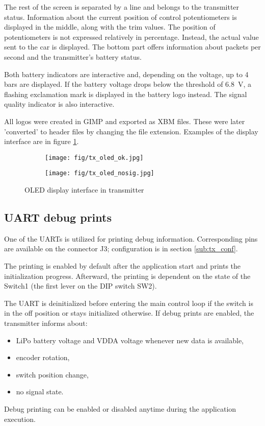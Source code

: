 The rest of the screen is separated by a line and belongs to the transmitter status. Information about the current position of control potentiometers is displayed in the middle, along with the trim values. The position of potentiometers is not expressed relatively in percentage. Instead, the actual value sent to the car is displayed. The bottom part offers information about packets per second and the transmitter's battery status.

Both battery indicators are interactive and, depending on the voltage, up to 4 bars are displayed. If the battery voltage drops below the threshold of \SI{6.8}{\V}, a flashing exclamation mark is displayed in the battery logo instead. The signal quality indicator is also interactive.

All logos were created in GIMP and exported as XBM files. These were later 'converted' to header files by changing the file extension. Examples of the display interface are in figure \ref{fig:tx_oled}.
\begin{figure}[h]
    \centering
    \begin{subfigure}{0.35\textwidth}
    \centering
        \texttt{[image: fig/tx\_oled\_ok.jpg]}
    \end{subfigure}%
    \hspace{1cm}
    \begin{subfigure}{0.35\textwidth}
    \centering
		\texttt{[image: fig/tx\_oled\_nosig.jpg]}
    \end{subfigure}
	\caption{OLED display interface in transmitter}
    \label{fig:tx_oled}
\end{figure}

\subsection{UART debug prints}
One of the UARTs is utilized for printing debug information. Corresponding pins are available on the connector J3; configuration is in section \ref{sub:tx_conf}.

The printing is enabled by default after the application start and prints the initialization progress. Afterward, the printing is dependent on the state of the Switch1 (the first lever on the DIP switch SW2).

The UART is deinitialized before entering the main control loop if the switch is in the off position or stays initialized otherwise. If debug prints are enabled, the transmitter informs about:
\newpage
\begin{itemize}
\item LiPo battery voltage and VDDA voltage whenever new data is available,
\item encoder rotation,
\item switch position change,
\item no signal state.
\end{itemize}
Debug printing can be enabled or disabled anytime during the application execution.




